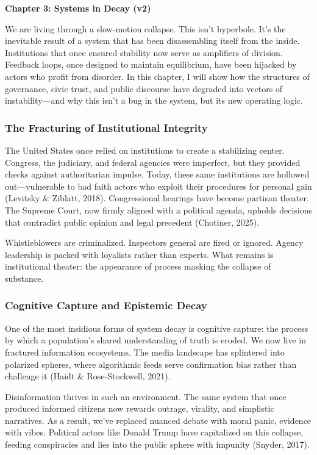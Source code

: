 \documentclass[
]{article}
\author{}
\date{}
\begin{document}
\textbf{Chapter 3: Systems in Decay (v2)}

We are living through a slow-motion collapse. This isn't hyperbole. It's the inevitable result of a system that has been disassembling itself from the inside. Institutions that once ensured stability now serve as amplifiers of division. Feedback loops, once designed to maintain equilibrium, have been hijacked by actors who profit from disorder. In this chapter, I will show how the structures of governance, civic trust, and public discourse have degraded into vectors of instability---and why this isn't a bug in the system, but its new operating logic.

\subsubsection{The Fracturing of Institutional Integrity}\label{the-fracturing-of-institutional-integrity}

The United States once relied on institutions to create a stabilizing center. Congress, the judiciary, and federal agencies were imperfect, but they provided checks against authoritarian impulse. Today, these same institutions are hollowed out---vulnerable to bad faith actors who exploit their procedures for personal gain (Levitsky \& Ziblatt, 2018). Congressional hearings have become partisan theater. The Supreme Court, now firmly aligned with a political agenda, upholds decisions that contradict public opinion and legal precedent (Chotiner, 2025).

Whistleblowers are criminalized. Inspectors general are fired or ignored. Agency leadership is packed with loyalists rather than experts. What remains is institutional theater: the appearance of process masking the collapse of substance.

\subsubsection{Cognitive Capture and Epistemic Decay}\label{cognitive-capture-and-epistemic-decay}

One of the most insidious forms of system decay is cognitive capture: the process by which a population's shared understanding of truth is eroded. We now live in fractured information ecosystems. The media landscape has splintered into polarized spheres, where algorithmic feeds serve confirmation bias rather than challenge it (Haidt \& Rose-Stockwell, 2021).

Disinformation thrives in such an environment. The same system that once produced informed citizens now rewards outrage, virality, and simplistic narratives. As a result, we've replaced nuanced debate with moral panic, evidence with vibes. Political actors like Donald Trump have capitalized on this collapse, feeding conspiracies and lies into the public sphere with impunity (Snyder, 2017).
\end{document}
